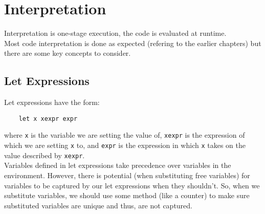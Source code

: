 \section{Interpretation}

Interpretation is one-stage execution, the code is evaluated
at runtime.
\\[\baselineskip]
Most code interpretation is done as expected (refering to the
earlier chapters) but there are some key concepts to consider.

\subsection{Let Expressions}

Let expressions have the form: \begin{lstlisting}
    let x xexpr expr
\end{lstlisting} where \texttt{x} is the variable we are
setting the value of, \texttt{xexpr} is the expression of
which we are setting \texttt{x} to, and \texttt{expr} is the
expression in which \texttt{x} takes on the value described
by \texttt{xexpr}.
\\[\baselineskip]
Variables defined in let expressions take precedence over
variables in the environment. However, there is potential 
(when substituting free variables) for variables to be
captured by our let expressions when they shouldn't.
So, when we substitute variables, we should use some
method (like a counter) to make sure substituted variables
are unique and thus, are not captured.